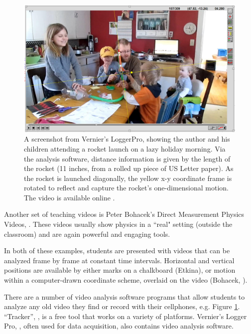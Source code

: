 \documentclass[12pt]{iopart}
\begin{document}
\begin{figure}[h]
\centering
\includegraphics[width=\columnwidth]{figure_2_Rocket.png}
\caption{A screenshot from Vernier's LoggerPro, showing the author and his children attending a rocket launch on a lazy holiday morning.  Via the analysis software, distance information is given by the length of the rocket (11 inches, from a rolled up piece of US Letter paper).  As the rocket is launched diagonally,  the yellow x-y coordinate frame is rotated to reflect and capture the rocket's one-dimensional motion.  The video is available online \cite{rocket-github}.
}
\label{figure-2-rocket}
\end{figure}

Another set of teaching videos is Peter Bohacek's Direct Measurement Physics Videos, \cite{Bohacek_overview} .
These videos usually show physics in a ``real" setting (outside the classroom) and are again powerful and engaging tools.  

In both of these examples, students are presented with videos that can be analyzed frame by frame at constant time intervals.  Horizontal and vertical positions are available by either marks on a chalkboard (Etkina), or motion within a computer-drawn coordinate scheme, overlaid on the video (Bohacek, \cite{Bohacek_overview}).  

There are a number of video analysis software programs that allow students to analyze any old video they find or record with their cellphones, e.g. Figure \ref{figure-2-rocket}.  ``Tracker'', \cite{Tracker}, is a free tool that works on a variety of platforms. Vernier's Logger Pro, \cite{LoggerPro}, often used for data acquisition, also contains video analysis software.  
\end{document}
